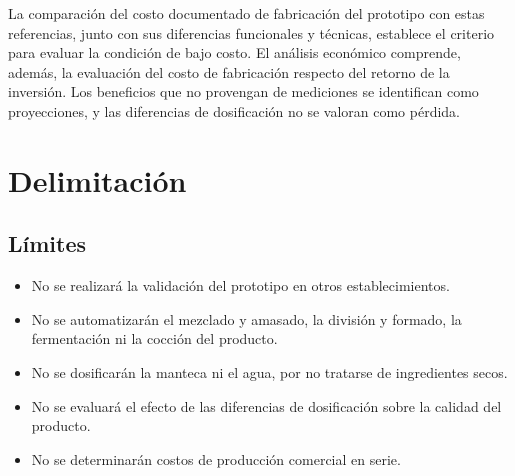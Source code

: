 La comparación del costo documentado de fabricación del prototipo con
estas referencias, junto con sus diferencias funcionales y técnicas,
establece el criterio para evaluar la condición de bajo costo. El análisis
económico comprende, además, la evaluación del costo de fabricación
respecto del retorno de la inversión. Los beneficios que no provengan de
mediciones se identifican como proyecciones, y las diferencias de
dosificación no se valoran como pérdida.


\section{Delimitación}
\label{sec:delimitacion}


\subsection{Límites}
\label{subsec:limites}

\begin{itemize}

    \item No se realizará la validación del prototipo en otros
    establecimientos.

    \item No se automatizarán el mezclado y amasado, la división y formado,
    la fermentación ni la cocción del producto.

    \item No se dosificarán la manteca ni el agua, por no tratarse de
    ingredientes secos.

    \item No se evaluará el efecto de las diferencias de dosificación sobre
    la calidad del producto.

    \item No se determinarán costos de producción comercial en serie.

\end{itemize}



